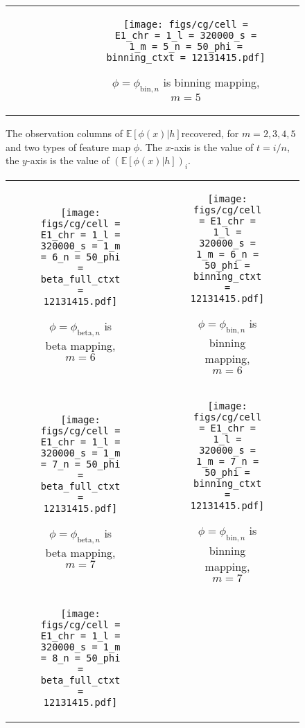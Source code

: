 \documentclass{article}
\def\E{\mathbb{E}}
\def\bin{\text{bin}}
\def\bet{\text{beta}}
\begin{document}
\begin{figure}[H]
\begin{tabular}{cc}
\begin{subfigure}[t]{0.4\textwidth}
    \end{subfigure}
    &
    \begin{subfigure}[t]{0.4\textwidth}
        \texttt{[image: figs/cg/cell = E1\_chr = 1\_l = 320000\_s = 1\_m = 5\_n = 50\_phi = binning\_ctxt = 12131415.pdf]}
        \caption{$\phi = \phi_{\bin, n}$ is binning mapping, $m = 5$}
    \end{subfigure}
    \end{tabular}
    \caption{The observation columns of $\E[\phi(x)|h]$recovered, for $m = 2,3,4,5$ and two types of feature map $\phi$. The $x$-axis is the value of $t = i/n$, the $y$-axis is the value of $(\E[\phi(x)|h])_i$.}
    \label{fig:varyphicg}
\end{figure}

\begin{figure}[H]
    \begin{tabular}{cc}
    \begin{subfigure}[t]{0.4\textwidth}
      \texttt{[image: figs/cg/cell = E1\_chr = 1\_l = 320000\_s = 1\_m = 6\_n = 50\_phi = beta\_full\_ctxt = 12131415.pdf]}
      \caption{$\phi = \phi_{\bet, n}$ is beta mapping, $m = 6$}
    \end{subfigure}
    &
    \begin{subfigure}[t]{0.4\textwidth}
      \texttt{[image: figs/cg/cell = E1\_chr = 1\_l = 320000\_s = 1\_m = 6\_n = 50\_phi = binning\_ctxt = 12131415.pdf]}
      \caption{$\phi = \phi_{\bin, n}$ is binning mapping, $m = 6$}
    \end{subfigure}
    \\
    \begin{subfigure}[t]{0.4\textwidth}
        \texttt{[image: figs/cg/cell = E1\_chr = 1\_l = 320000\_s = 1\_m = 7\_n = 50\_phi = beta\_full\_ctxt = 12131415.pdf]}
        \caption{$\phi = \phi_{\bet, n}$ is beta mapping, $m = 7$}
    \end{subfigure}
    &
    \begin{subfigure}[t]{0.4\textwidth}
        \texttt{[image: figs/cg/cell = E1\_chr = 1\_l = 320000\_s = 1\_m = 7\_n = 50\_phi = binning\_ctxt = 12131415.pdf]}
        \caption{$\phi = \phi_{\bin, n}$ is binning mapping, $m = 7$}
    \end{subfigure}
    \\
    \begin{subfigure}[t]{0.4\textwidth}
        \texttt{[image: figs/cg/cell = E1\_chr = 1\_l = 320000\_s = 1\_m = 8\_n = 50\_phi = beta\_full\_ctxt = 12131415.pdf]}

\end{subfigure}
\end{tabular}
\end{figure}
\end{document}
